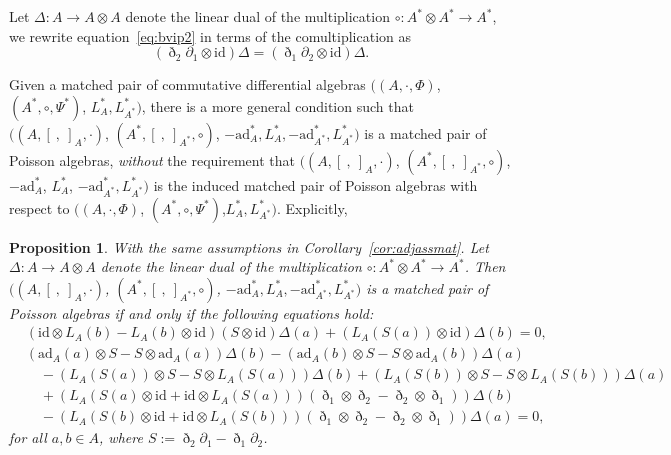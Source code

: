 \documentclass[pdftex]{sigma}
\numberwithin{equation}{section}
\newtheorem{Proposition}[Theorem]{Proposition}
{ \theoremstyle{definition}
	\newtheorem{Definition}[Theorem]{Definition}
	\newtheorem{Note}[Theorem]{Note}
	\newtheorem{Example}[Theorem]{Example}
	\newtheorem{Remark}[Theorem]{Remark} }
\newcommand{\ad}{\mathrm{ad}}
\newcommand{\id}{\mathrm{id}}
\begin{document}
\begin{Remark}\label{rmk:cc}
 Let $\Delta\colon A \to A \otimes A$ denote the linear dual of the multiplication $\circ\colon A^* \otimes A^* \to A^*$, we rewrite equation~\eqref{eq:bvip2} in terms of the comultiplication as
 \begin{equation}
 	(\eth_2\partial_1 \otimes \id)\Delta = (\eth_1\partial_2 \otimes \id)\Delta. \label{eq:vip2}
 \end{equation}
\end{Remark}


Given a matched pair of commutative differential algebras $((A, \cdot, \Phi)$, $(A^*, \circ, \Psi^*)$, $L_{A}^*,L_{A^*}^*)$,
there is a more general condition such that $((A, [\ ,\ ]_A, \cdot)$, $(A^*, [\ ,\ ]_{A^*}, \circ)$, $-\ad_A^*, L_A^*, -\ad_{A^*}^*, L_{A^*}^*)$ is a matched pair of Poisson algebras,
\textit{without} the requirement that $((A, [\ ,\ ]_A, \cdot)$, $(A^*, [\ ,\ ]_{A^*}, \circ)$, $-\ad_A^*$, $L_A^*$, $-\ad_{A^*}^*, L_{A^*}^*)$ is the induced matched pair of Poisson algebras with respect to $((A, \cdot, \Phi)$, $(A^*, \circ, \Psi^*)$,$L_{A}^*,L_{A^*}^*)$.
Explicitly,
\begin{Proposition}\label{pro:gmp}
 With the same assumptions in Corollary~{\rm \ref{cor:adjassmat}}.
 Let $\Delta\colon A \to A \otimes A$ denote the linear dual of the multiplication $\circ\colon A^* \otimes A^* \to A^*$.
 Then $((A, [\ ,\ ]_A, \cdot)$, $(A^*, [\ ,\ ]_{A^*}, \circ)$, $-\ad_A^*, L_A^*, -\ad_{A^*}^*, L_{A^*}^*)$ is a matched pair of Poisson algebras
 if and only if the following equations hold:
 \begin{align}
 &(\id \otimes L_A(b) - L_A(b) \otimes \id )(S \otimes \id) \Delta(a) + ( L_A(S(a)) \otimes \id) \Delta(b)=0, \label{eq:dpb1} \\
 &(\ad_A (a) \otimes S - S \otimes \ad_A (a) )\Delta(b) - (\ad_A (b) \otimes S - S \otimes \ad_A (b) )\Delta(a) \nonumber \\
 &\quad - (L_A(S(a)) \otimes S - S \otimes L_A(S(a)))\Delta(b) + (L_A(S(b)) \otimes S - S \otimes L_A(S(b)))\Delta(a)\nonumber\\
 &\quad + (L_A(S(a) \otimes \id + \id \otimes L_A(S(a)))(\eth_1 \otimes \eth_2 - \eth_2 \otimes \eth_1) )\Delta(b) \nonumber \\
 &\quad - (L_A(S(b) \otimes \id + \id \otimes L_A(S(b)))(\eth_1 \otimes \eth_2 - \eth_2 \otimes \eth_1) )\Delta(a)=0, \label{eq:dpb2}
 \end{align}
 for all $a,b \in A$, where $S:= \eth_2 \partial_1 - \eth_1 \partial_2$.
\end{Proposition}
\end{document}
